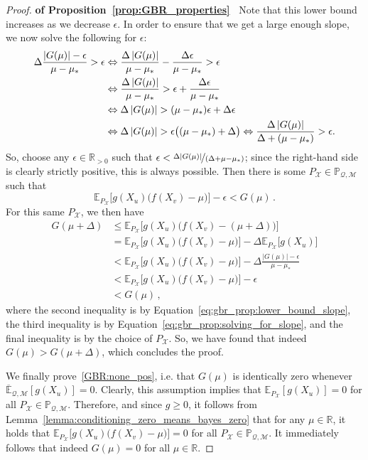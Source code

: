 \documentclass[3p]{elsarticle}
\newcommand{\reals}{\mathbb{R}}
\newcommand{\realspos}{\reals_{>0}}
\newcommand{\states}{\mathcal{X}}
\newcommand{\uexp}{\overline{\mathbb{E}}_{\rateset,\mathcal{M}}}
\newcommand{\rateset}{\mathcal{Q}}
\newcommand{\asa}{\Leftrightarrow}
\newcommand{\abs}[1]{\left\vert #1 \right\vert}
\begin{document}
\begin{proof}{\bf of Proposition~\ref{prop:GBR_properties}~}
Note that this lower bound increases as we decrease $\epsilon$. In order to ensure that we get a large enough slope, we now solve the following for $\epsilon$:
\begin{align}
\Delta\frac{\abs{G(\mu)}-\epsilon}{\mu-\mu_*} > \epsilon 
&\asa
\frac{\Delta\abs{G(\mu)}}{\mu-\mu_*} - \frac{\Delta\epsilon}{\mu-\mu_*} > \epsilon\notag\\
&\asa
\frac{\Delta\abs{G(\mu)}}{\mu-\mu_*} > \epsilon + \frac{\Delta\epsilon}{\mu-\mu_*} \notag\\
&\asa\Delta\abs{G(\mu)} > (\mu-\mu_*)\epsilon + \Delta\epsilon \notag\\
&\asa\Delta\abs{G(\mu)} > \epsilon\bigl((\mu-\mu_*) + \Delta\bigr)
\asa
\frac{\Delta\abs{G(\mu)}}{\Delta + (\mu-\mu_*)} > \epsilon.\label{eq:gbr_prop:solving_for_slope}
\end{align}
So, choose any $\epsilon\in\realspos$ such that $\epsilon< \nicefrac{\Delta\abs{G(\mu)}}{(\Delta + \mu-\mu_*)}$; since the right-hand side is clearly strictly positive, this is always possible. Then there is some $P_\states\in\mathbb{P}_{\rateset,\mathcal{M}}$ such that
\begin{equation*}
\mathbb{E}_{P_\states}\bigl[g(X_u)\bigl(f(X_v)-\mu\bigr)\bigr] - \epsilon < G(\mu)\,.
\end{equation*}
For this same $P_\states$, we then have
\begin{align*}
G(\mu+\Delta) &\leq \mathbb{E}_{P_\states}\bigl[g(X_u)\bigl(f(X_v)-(\mu+\Delta)\bigr)\bigr] \\
 &= \mathbb{E}_{P_\states}\bigl[g(X_u)\bigl(f(X_v)-\mu\bigr)\bigr] - \Delta\mathbb{E}_{P_\states}\bigl[g(X_u)\bigr] \\
 &< \mathbb{E}_{P_\states}\bigl[g(X_u)\bigl(f(X_v)-\mu\bigr)\bigr] - \Delta\frac{\abs{G(\mu)}-\epsilon}{\mu-\mu_*} \\
 &< \mathbb{E}_{P_\states}\bigl[g(X_u)\bigl(f(X_v)-\mu\bigr)\bigr] - \epsilon \\
 &< G(\mu)\,,
\end{align*}
where the second inequality is by Equation~\eqref{eq:gbr_prop:lower_bound_slope}, the third inequality is by Equation~\eqref{eq:gbr_prop:solving_for_slope}, and the final inequality is by the choice of $P_\states$. So, we have found that indeed $G(\mu)>G(\mu+\Delta)$, which concludes the proof.

We finally prove~\ref{GBR:none_pos}, i.e. that $G(\mu)$ is identically zero whenever $\uexp[g(X_u)]=0$. Clearly, this assumption implies that $\mathbb{E}_{P_\states}[g(X_u)]=0$ for all $P_\states\in\mathbb{P}_{\rateset,\mathcal{M}}$. Therefore, and since $g\geq 0$, it follows from Lemma~\ref{lemma:conditioning_zero_means_bayes_zero} that for any $\mu\in\reals$, it holds that $\mathbb{E}_{P_\states}\bigl[g(X_u)\bigl(f(X_v) - \mu\bigr)\bigr]=0$ for all $P_\states\in\mathbb{P}_{\rateset,\mathcal{M}}$. It immediately follows that indeed $G(\mu)=0$ for all $\mu\in\reals$.
\end{proof}
\end{document}
